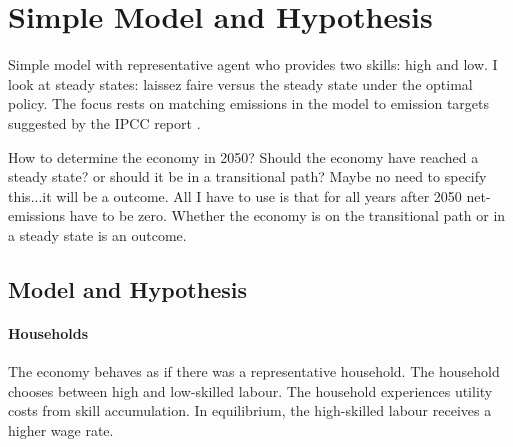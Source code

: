 \section{Simple Model and Hypothesis}
Simple model with representative agent who provides two skills: high and low. I look at steady states: laissez faire versus the steady state under the optimal policy. 
The focus rests on matching emissions in the model to emission targets suggested by the IPCC report \citep{Rogelj2018MitigationDevelopment.}. 

How to determine the economy in 2050? Should the economy have reached a steady state? or should it be in a transitional path? Maybe no need to specify this...it will be a outcome. All I have to use is that for all years after 2050 net-emissions have to be zero. Whether the economy is on the transitional path or in a steady state is an outcome. 
\subsection{Model and Hypothesis}

\paragraph{Households}
The economy behaves as if there was a representative household. The household chooses between high and low-skilled labour. The household experiences utility costs from skill accumulation. In equilibrium, the high-skilled labour receives a higher wage rate. 

